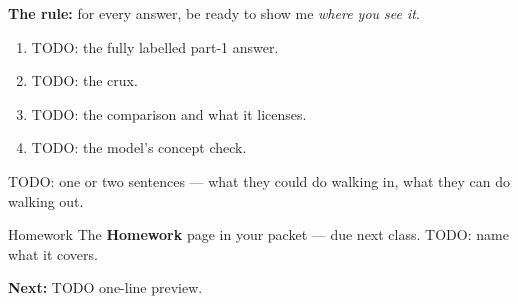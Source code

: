 \documentclass[aspectratio=169, 11pt]{beamer}
\begin{document}
\begin{frame}[t, plain]
  \vspace{2pt}
  \textbf{The rule:} for every answer, be ready to show me \emph{where you see it}.
\end{frame}

\begin{frame}[t, plain]
  \begin{enumerate}\setlength{\itemsep}{5pt}
    \item TODO: the fully labelled part-1 answer.
    \item TODO: the crux.
    \item TODO: the comparison and what it licenses.
    \item TODO: the model's concept check.
  \end{enumerate}
\end{frame}

\begin{frame}[t, plain]
  TODO: one or two sentences --- what they could do walking in, what they can do walking out.
  \vspace{5pt}
  \begin{block}{Homework}
    The \textbf{Homework} page in your packet --- due next class. TODO: name what it covers.
  \end{block}
  \vspace{4pt}
  \textbf{Next:} TODO one-line preview.
\end{frame}
\end{document}
